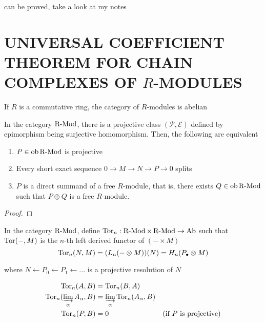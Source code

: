 \documentclass{article}
\begin{document}
\begin{longproof}
    can be proved, take a look at my notes
\end{longproof}

\section{UNIVERSAL COEFFICIENT THEOREM FOR CHAIN COMPLEXES OF $R$-MODULES}

\begin{remark}
    If $R$ is a commutative ring, the category of $R$-modules is abelian
\end{remark}

\begin{remark}
    In the category $\operatorname{R-Mod}$, there is a projective class $(\mathcal{P}, \mathcal{E})$ defined by epimorphism being surjective homomorphism. Then, the following are equivalent
    \begin{enumerate}
        \item $P \in \operatorname{ob} \operatorname{R-Mod}$ is projective
        \item Every short exact sequence $0 \to M \to N \to P \to 0$ splits
        \item $P$ is a direct summand of a free $R$-module, that is, there exists $Q \in \operatorname{ob} \operatorname{R-Mod}$ such that $P \oplus Q$ is a free $R$-module.
    \end{enumerate}    
\end{remark}

\begin{proof}
\end{proof}

\begin{definition}
    In the category $\operatorname{R-Mod}$, define $\operatorname{Tor}_n: \operatorname{R-Mod} \times \operatorname{R-Mod} \to \operatorname{Ab}$ such that $\operatorname{Tor}(-, M)$ is the $n$-th left derived functor of $(- \times M)$
    $$
        \operatorname{Tor}_n(N, M) = (L_n (- \otimes M))(N) = H_n(P_\bullet \otimes M)
    $$

    where $N \leftarrow P_0 \leftarrow P_1 \leftarrow ...$ is a projective resolution of $N$
\end{definition}

\begin{remark}
    \begin{align*}
        \operatorname{Tor}_n(A, B) &= \operatorname{Tor}_n(B, A) \\
        \operatorname{Tor}_n (\varinjlim_\alpha A_\alpha, B) &= \varinjlim_\alpha \operatorname{Tor}_n (A_\alpha, B) \\
        \operatorname{Tor}_n(P, B) &= 0 &\text{(if $P$ is projective)} \\
    \end{align*}
\end{remark}
\end{document}
